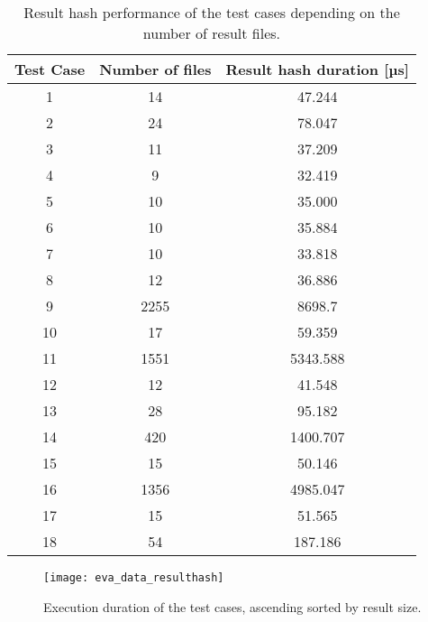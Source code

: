 \documentclass[draft,final]{vutinfth} %
\begin{document}
\begin{itemize}
	\begin{table}[]
		\caption{Result hash performance of the test cases depending on the number of result files.}
		\begin{tabular}{c|c|c}
			\textbf{Test Case} & \textbf{Number of files} & \textbf{Result hash duration [µs]}  \\ \hline
			1 & 14  & 47.244 \\ \hline 
			2 & 24 & 78.047 \\ \hline
			3 & 11 & 37.209 \\ \hline
			4 & 9 & 32.419 \\ \hline
			5 & 10 & 35.000 \\ \hline
			6 & 10 & 35.884 \\ \hline
			7 & 10 & 33.818 \\ \hline
			8 & 12 & 36.886 \\ \hline
			9 & 2255 & 8698.7 \\ \hline
			10 & 17 & 59.359 \\ \hline
			11 & 1551 & 5343.588 \\ \hline
			12 & 12 & 41.548 \\ \hline
			13 & 28 & 95.182 \\ \hline
			14 & 420 & 1400.707 \\ \hline
			15 & 15 & 50.146 \\ \hline
			16 & 1356 & 4985.047 \\ \hline
			17 & 15 & 51.565 \\ \hline
			18 & 54 & 187.186 \\ 
		\end{tabular}
		\label{Tab:data_result_hash}
	\end{table}
	
	\begin{figure}[h]
		\centering
		\texttt{[image: eva\_data\_resulthash]}
		\caption{Execution duration of the test cases, ascending sorted by result size.}
		\label{fig:evaluation_data_resulthash} %
	\end{figure}
	

\end{itemize}
\end{document}
